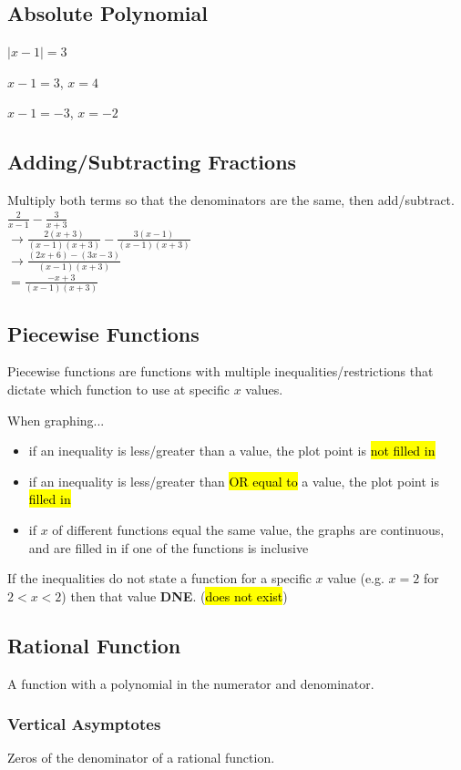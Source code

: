 \documentclass[a4paper,12pt]{article}
\begin{document}
\subsection{Absolute Polynomial}
\Large
$|x-1| = 3$

$x-1 = 3$,
$x = 4$

$x-1 = -3$,
$x = -2$
\normalsize

\subsection{Adding/Subtracting Fractions}
Multiply both terms so that the denominators are the same, then add/subtract.\\
\Large
$\frac{2}{x-1} - \frac{3}{x+3}$\\
$\longrightarrow\frac{2(x+3)}{(x-1)(x+3)} - \frac{3(x-1)}{(x-1)(x+3)}$\\
$\longrightarrow\frac{(2x+6) - (3x-3)}{(x-1)(x+3)}$\\
$=\frac{-x+3}{(x-1)(x+3)}$
\normalsize

\subsection{Piecewise Functions}
Piecewise functions are functions with multiple inequalities/restrictions that dictate which function to use at specific $x$ values.

When graphing... 
\begin{itemize}
    \item{if an inequality is less/greater than a value, the plot point is \hl{not filled in}}
    \item{if an inequality is less/greater than \hl{OR equal to} a value, the plot point is \hl{filled in}}
    \item{if $x$ of different functions equal the same value, the graphs are continuous, and are filled in if one of the functions is inclusive}
\end{itemize}

If the inequalities do not state a function for a specific $x$ value (e.g. $x = 2$ for $2 < x < 2$) then that value \textbf{DNE}. (\hl{does not exist})

\subsection{Rational Function}
A function with a polynomial in the numerator and denominator.

\subsubsection{Vertical Asymptotes}
Zeros of the denominator of a rational function.
\end{document}
